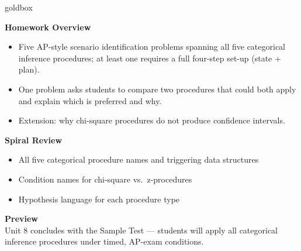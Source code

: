 \documentclass[10pt]{article}
\begin{document}
\begin{skillbox}{goldbox}
\begin{minipage}[t]{0.48\linewidth}
    \textbf{Homework Overview}
    \begin{itemize}
        \item Five AP-style scenario identification problems spanning all five categorical
              inference procedures; at least one requires a full four-step set-up (state + plan).
        \item One problem asks students to compare two procedures that could both apply and
              explain which is preferred and why.
        \item Extension: why chi-square procedures do not produce confidence intervals.
    \end{itemize}
\end{minipage}
\hfill
\begin{minipage}[t]{0.48\linewidth}
    \textbf{Spiral Review}
    \begin{itemize}
        \item All five categorical procedure names and triggering data structures
        \item Condition names for chi-square vs.\ z-procedures
        \item Hypothesis language for each procedure type
    \end{itemize}
    \textbf{Preview}\\
    Unit 8 concludes with the Sample Test --- students will apply all categorical inference
    procedures under timed, AP-exam conditions.
\end{minipage}
\end{skillbox}
\end{document}
